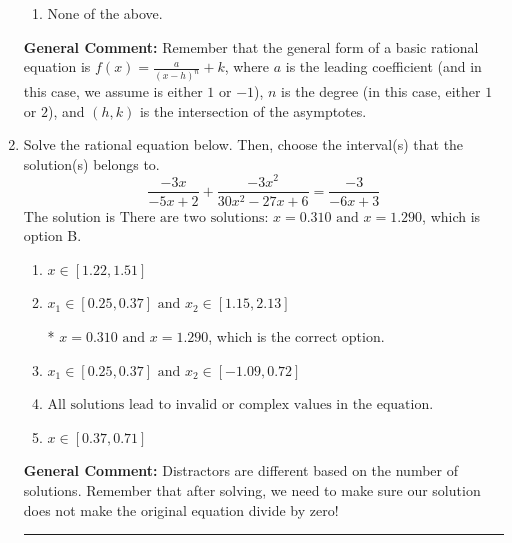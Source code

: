 \documentclass{extbook}[14pt]
\newcommand{\litem}[1]{\item #1

\rule{\textwidth}{0.4pt}}
\begin{document}
\begin{enumerate}
{\begin{enumerate}[label=\Alph*.]
\item None of the above.\end{enumerate}
\textbf{General Comment:} Remember that the general form of a basic rational equation is $ f(x) = \frac{a}{(x-h)^n} + k$, where $a$ is the leading coefficient (and in this case, we assume is either $1$ or $-1$), $n$ is the degree (in this case, either $1$ or $2$), and $(h, k)$ is the intersection of the asymptotes.
}
\litem{
Solve the rational equation below. Then, choose the interval(s) that the solution(s) belongs to.
\[ \frac{-3x}{-5x + 2} + \frac{-3x^{2}}{30x^{2} -27 x + 6} = \frac{-3}{-6x + 3} \]The solution is \( \text{There are two solutions: } x = 0.310 \text{ and } x = 1.290 \), which is option B.\begin{enumerate}[label=\Alph*.]
\item \( x \in [1.22,1.51] \)


\item \( x_1 \in [0.25, 0.37] \text{ and } x_2 \in [1.15,2.13] \)

* $x = 0.310 \text{ and } x = 1.290$, which is the correct option.
\item \( x_1 \in [0.25, 0.37] \text{ and } x_2 \in [-1.09,0.72] \)


\item \( \text{All solutions lead to invalid or complex values in the equation.} \)


\item \( x \in [0.37,0.71] \)


\end{enumerate}

\textbf{General Comment:} Distractors are different based on the number of solutions. Remember that after solving, we need to make sure our solution does not make the original equation divide by zero!
}
\end{enumerate}
\end{document}
